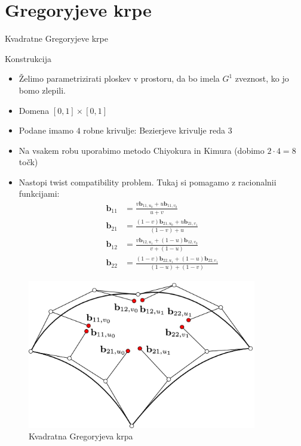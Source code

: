 \documentclass[a4paper,8pt]{beamer}
\newcommand{\tbf}{\textbf}
\begin{document}
\section{Gregoryjeve krpe}
\begin{frame}{Kvadratne Gregoryjeve krpe}


Konstrukcija
\begin{itemize}
	\item Želimo parametrizirati ploskev v prostoru, da bo imela $G^1$ zveznost, ko jo bomo zlepili.
	\item Domena $[0,1] \times [0,1]$
	\item Podane imamo $4$ robne krivulje: Bezierjeve krivulje reda $3$
	\item Na vsakem robu uporabimo metodo Chiyokura in Kimura (dobimo $2 \cdot 4 = 8$ točk)
	\item Nastopi twist compatibility problem. Tukaj si pomagamo z racionalnii funkcijami:
		\begin{align*}
		\textbf{b}_{11} &=  \frac{v \textbf{b}_{11,u_0}+u\tbf{b}_{11,v_0}}{u +v} \\
		\tbf{b}_{21} &= \frac{(1-v) \tbf{b}_{21,u_0}+u\tbf{b}_{21,v_1}}{(1-v)+u} \\
		\tbf{b}_{12} &= \frac{v \tbf{b}_{12,u_1}+(1-u)\tbf{b}_{12,v_0}}{v+(1-u)} \\
		\tbf{b}_{22} &= \frac{(1-v) \tbf{b}_{22,u_1}+(1-u)\tbf{b}_{22,v_1}}{(1-u)+(1-v)} 
		\end{align*}
\end{itemize}
	
\end{frame}
\begin{frame}
	\begin{figure}[h]
		\centering
		\includegraphics[width=10cm]{gregory_krpe_kvadratna.jpg}
		\caption{Kvadratna Gregoryjeva krpa}
	\end{figure}
\end{frame}
\end{document}
